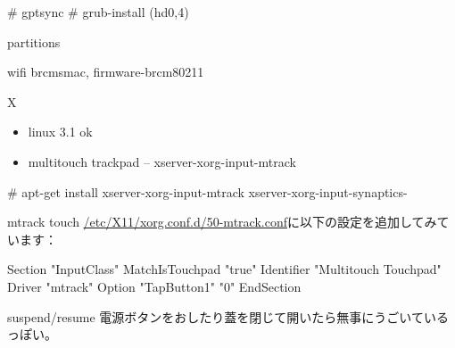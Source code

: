 \begin{frame}[containsverbatim]{}
  \begin{commandline}
# gptsync
# grub-install (hd0,4)
 \end{commandline}
\end{frame}

\begin{frame}[containsverbatim]{partitions}
\end{frame}

\begin{frame}{wifi}
brcmsmac, firmware-brcm80211
\end{frame}

\begin{frame}[containsverbatim]{X}
\begin{itemize}
 \item linux 3.1 ok
 \item multitouch trackpad -- xserver-xorg-input-mtrack
\end{itemize}
\begin{commandline}
# apt-get install xserver-xorg-input-mtrack xserver-xorg-input-synaptics-
\end{commandline}
\end{frame}

\begin{frame}[containsverbatim]{mtrack touch}
\url{/etc/X11/xorg.conf.d/50-mtrack.conf}に以下の設定を追加してみています：

\begin{commandline}
Section "InputClass"
	MatchIsTouchpad "true"
	Identifier "Multitouch Touchpad"
	Driver "mtrack"
	Option "TapButton1" "0"
EndSection
\end{commandline}
 
\end{frame}


\begin{frame}{suspend/resume}
電源ボタンをおしたり蓋を閉じて開いたら無事にうごいているっぽい。
 
\end{frame}


